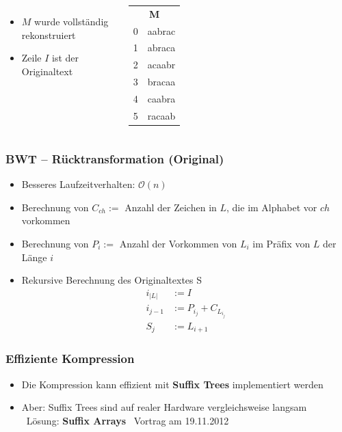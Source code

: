 \documentclass[14pt,xcolor=dvipsnames,pdftex]{beamer}
\begin{document}
\begin{frame}[allowframebreaks]
\begin{columns}
\end{columns}
\framebreak
\begin{columns}
\begin{itemize}
 \item $M$ wurde vollständig rekonstruiert
 \item Zeile $I$ ist der {\color{red}Originaltext}
\end{itemize}
\begin{tabular}{c|T}
     \\
    0 & aabrac \\
    {\color{red}1} & {\color{red}abraca}\\
    2 & acaabr \\
    3 & bracaa \\
    4 & caabra \\
    5 & racaab
\end{tabular}
\end{columns}
\end{frame}
\begin{frame}
\frametitle{BWT -- Rücktransformation (Original)}
\begin{itemize}
 \item Besseres Laufzeitverhalten: $\mathcal{O}(n)$
 \item Berechnung von $C_{ch} := $ Anzahl der Zeichen in $L$, die im Alphabet vor $ch$ vorkommen
 \item Berechnung von $P_i := $ Anzahl der Vorkommen von $L_i$ im Präfix von $L$ der Länge $i$
 \item Rekursive Berechnung des Originaltextes S
 \begin{align}
 i_{|L|} &:= I\\
 i_{j-1} &:= P_{i_j} + C_{L_{i_j}}\\
 S_j &:= L_{i+1}
 \end{align}
\end{itemize}
\end{frame}
\begin{frame}
\frametitle{Effiziente Kompression}
\begin{itemize}
\item Die Kompression kann effizient mit \textbf{Suffix Trees} implementiert werden
\item Aber: Suffix Trees sind auf realer Hardware vergleichsweise langsam \\
\textrightarrow\ Lösung: \textbf{Suffix Arrays} \textrightarrow\ Vortrag am 19.11.2012
\end{itemize}
\end{frame}
\end{document}
